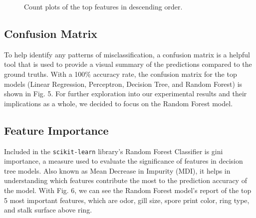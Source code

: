 \documentclass[11pt, conference]{IEEEtran}
\begin{document}
    \begin{figure}[htbp] \ContinuedFloat
        \caption{Count plots of the top features in descending order.}
        \label{fig:graphic3}  
    \end{figure}

    \subsection{Confusion Matrix}
    To help identify any patterns of misclassification, a confusion matrix is a helpful tool that is used to provide a visual summary of the predictions compared to the ground truths. With a 100\% accuracy rate, the confusion matrix for the top models (Linear Regression, Perceptron, Decision Tree, and Random Forest) is shown in Fig. 5. For further exploration into our experimental results and their implications as a whole, we decided to focus on the Random Forest model.

    \subsection{Feature Importance}
    Included in the \texttt{scikit-learn} library's Random Forest Classifier is gini importance, a measure used to evaluate the significance of features in decision tree models. Also known as Mean Decrease in Impurity (MDI), it helps in understanding which features contribute the most to the prediction accuracy of the model. With Fig. 6, we can see the Random Forest model's report of the top 5 most important features, which are odor, gill size, spore print color, ring type, and stalk surface above ring.
\end{document}
